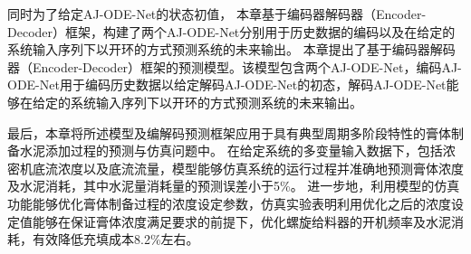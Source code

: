 
同时为了给定AJ-ODE-Net的状态初值，
本章基于编码器解码器（Encoder-Decoder）框架，构建了两个AJ-ODE-Net分别用于历史数据的编码以及在给定的系统输入序列下以开环的方式预测系统的未来输出。
本章提出了基于编码器解码器（Encoder-Decoder）框架的预测模型。该模型包含两个AJ-ODE-Net，编码AJ-ODE-Net用于编码历史数据以给定解码AJ-ODE-Net的初态，解码AJ-ODE-Net能够在给定的系统输入序列下以开环的方式预测系统的未来输出。

最后，本章将所述模型及编解码预测框架应用于具有典型周期多阶段特性的膏体制备水泥添加过程的预测与仿真问题中。
在给定系统的多变量输入数据下，包括浓密机底流浓度以及底流流量，模型能够仿真系统的运行过程并准确地预测膏体浓度及水泥消耗，其中水泥量消耗量的预测误差小于5\%。
进一步地，利用模型的仿真功能能够优化膏体制备过程的浓度设定参数，仿真实验表明利用优化之后的浓度设定值能够在保证膏体浓度满足要求的前提下，优化螺旋给料器的开机频率及水泥消耗，有效降低充填成本8.2\%左右。






